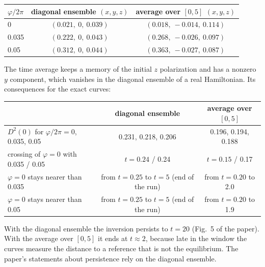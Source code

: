 \documentclass[11pt]{article}
\begin{document}
\begin{center}\small
\begin{tabular}{lcc}\toprule
$\varphi/2\pi$ & diagonal ensemble $(x,y,z)$ & average over $[0,5]$ $(x,y,z)$\\\midrule
0 & $(0.021,\ 0,\ 0.039)$ & $(0.018,\ -0.014,\ 0.114)$\\
0.035 & $(0.222,\ 0,\ 0.043)$ & $(0.268,\ -0.026,\ 0.097)$\\
0.05 & $(0.312,\ 0,\ 0.044)$ & $(0.363,\ -0.027,\ 0.087)$\\\bottomrule
\end{tabular}
\end{center}

The time average keeps a memory of the initial $z$ polarization and has a nonzero $y$ component, which vanishes in the diagonal ensemble of a real Hamiltonian. Its consequences for the exact curves:

\begin{center}\small
\begin{tabular}{lcc}\toprule
 & diagonal ensemble & average over $[0,5]$\\\midrule
$D^2(0)$ for $\varphi/2\pi=0$, 0.035, 0.05 & 0.231, 0.218, 0.206 & 0.196, 0.194, 0.188\\
crossing of $\varphi=0$ with 0.035 / 0.05 & $t=0.24$ / 0.24 & $t=0.15$ / 0.17\\
$\varphi=0$ stays nearer than 0.035 & from $t=0.25$ to $t=5$ (end of the run) & from $t=0.20$ to 2.0\\
$\varphi=0$ stays nearer than 0.05 & from $t=0.25$ to $t=5$ (end of the run) & from $t=0.20$ to 1.9\\\bottomrule
\end{tabular}
\end{center}

With the diagonal ensemble the inversion persists to $t=20$ (Fig.~5 of the paper). With the average over $[0,5]$ it ends at $t\approx2$, because late in the window the curves measure the distance to a reference that is not the equilibrium. The paper's statements about persistence rely on the diagonal ensemble.
\end{document}
